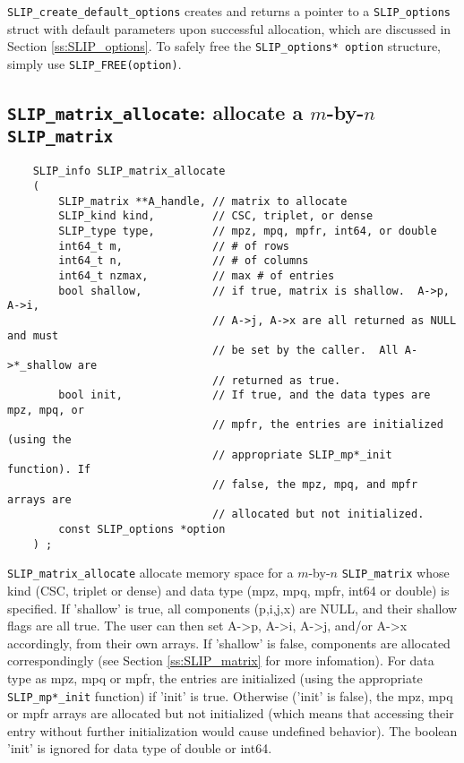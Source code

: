 \documentclass[12pt]{article}
\theoremstyle{definition}
\begin{document}
\verb|SLIP_create_default_options| creates and returns a pointer to a
\verb|SLIP_options| struct with default parameters upon successful allocation,
which are discussed in Section \ref{ss:SLIP_options}.  To safely free the
\verb|SLIP_options* option| structure, simply use \verb|SLIP_FREE(option)|.

\cprotect\subsection{\verb|SLIP_matrix_allocate|: allocate a $m$-by-$n$
\verb|SLIP_matrix|}
\label{s:user:matrix_allocate}

\begin{mdframed}[userdefinedwidth=6in]
{\footnotesize
\begin{verbatim}
    SLIP_info SLIP_matrix_allocate
    (
        SLIP_matrix **A_handle, // matrix to allocate
        SLIP_kind kind,         // CSC, triplet, or dense
        SLIP_type type,         // mpz, mpq, mpfr, int64, or double
        int64_t m,              // # of rows
        int64_t n,              // # of columns
        int64_t nzmax,          // max # of entries
        bool shallow,           // if true, matrix is shallow.  A->p, A->i,
                                // A->j, A->x are all returned as NULL and must
                                // be set by the caller.  All A->*_shallow are
                                // returned as true.
        bool init,              // If true, and the data types are mpz, mpq, or
                                // mpfr, the entries are initialized (using the
                                // appropriate SLIP_mp*_init function). If
                                // false, the mpz, mpq, and mpfr arrays are
                                // allocated but not initialized.
        const SLIP_options *option
    ) ;
\end{verbatim}
} \end{mdframed}

\verb|SLIP_matrix_allocate| allocate memory space for a $m$-by-$n$
\verb|SLIP_matrix| whose kind (CSC, triplet or dense) and data type (mpz, mpq,
mpfr, int64 or double) is specified. If 'shallow' is true, all components
(p,i,j,x) are NULL, and their shallow flags are all true. The user can then
set A->p, A->i, A->j, and/or A->x accordingly, from their own arrays. If
'shallow' is false, components are allocated correspondingly (see Section
\ref{ss:SLIP_matrix} for more infomation). For data type as mpz, mpq or mpfr,
the entries are initialized (using the appropriate \verb|SLIP_mp*_init|
function) if 'init' is true. Otherwise ('init' is false), the mpz, mpq or mpfr
arrays are allocated but not initialized (which means that accessing their
entry without further initialization would cause undefined behavior). The
boolean 'init' is ignored for data type of double or int64.
\end{document}

